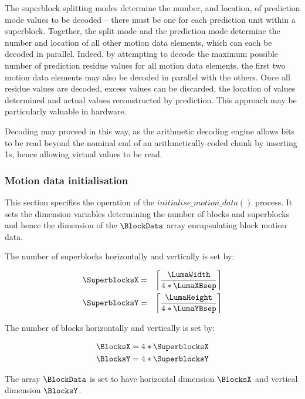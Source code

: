 \begin{informative}
The superblock splitting modes determine the number, and location, of prediction mode values to be decoded -- there
must be one for each prediction unit within a superblock. Together, the split mode and the prediction mode
determine the number and location of all other motion data elements, which can each be decoded in parallel. Indeed,
by attempting to decode the maximum possible number of prediction residue values for all motion data elements, the first 
two motion data elements may also be decoded in parallel with the others. Once all residue values are decoded, excess
values can be discarded, the location of values determined and actual values reconstructed by prediction. This approach
may be particularly valuable in hardware.

Decoding may proceed in this way, as the arithmetic decoding engine allows bits to be read beyond the nominal
end of an arithmetically-coded chunk by inserting 1s, hence allowing virtual values to be read.
\end{informative}

\subsubsection{Motion data initialisation}

\label{motioninit}

This section specifies the operation of the $initialise\_motion\_data()$ process. It sets the dimension variables determining the
number of blocks and superblocks and hence the dimension of the $\BlockData$ array encapsulating block motion
data.

The number of superblocks horizontally and vertically is set by:

\begin{eqnarray*}
\SuperblocksX & = & \left\lceil \frac{\LumaWidth}{4*\LumaXBsep} \right\rceil  \\
\SuperblocksY & = & \left\lceil \frac{\LumaHeight}{4*\LumaYBsep} \right\rceil 
\end{eqnarray*}

The number of blocks horizontally and vertically is set by:

\begin{eqnarray*}
\BlocksX = 4*\SuperblocksX \\
\BlocksY = 4*\SuperblocksY
\end{eqnarray*}

The array $\BlockData$ is set to have horizontal dimension $\BlocksX$ and vertical dimension $\BlocksY$.

